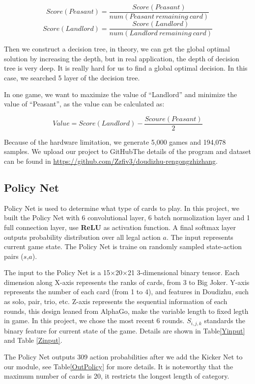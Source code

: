 \documentclass{article}
\begin{document}
$$
Score(Peasant) = \frac{Score (Peasant)}{num(Peasant \ remaining \ card)} $$
$$
Score(Landlord) = \frac{Score(Landlord)}{num(Landlord\  remaining \ card)}
$$

Then we construct a decision tree, in theory, we can get the global optimal solution by increasing the depth, but in real application, the depth of decision tree is very deep. It is really hard for us to find a global optimal decision. In this case, we searched 5 layer of the decision tree. 

In one game, we want to maximize the value of ``Landlord'' and minimize the value of ``Peasant'', as the value can be calculated as:

$$
Value = Score(Landlord)- \frac{Scoure(Peasant)}{2}
$$


Because of the hardware limitation, we generate 5,000 games and 194,078 samples. We upload our project to GitHubThe details of the program and dataset can be found in \url{https://github.com/Zzfiv3/doudizhu-rengongzhizhang}.

\subsection{Policy Net}
Policy Net is used to determine what type of cards to play. In this project, we built the Policy Net with 6 convolutional layer, 6 batch normolization layer and 1 full connection layer, use \textbf{ReLU} as activation function. A final softmax layer outputs probability distribution over all legal action $a$. The input represents current game state. The Policy Net is traine on randomly sampled state-action pairs ($s$,$a$). 

The input to the Policy Net is a 15$\times$20$\times$21 3-dimensional binary tensor. Each dimension along X-axis represents the ranks of cards, from 3 to Big Joker. Y-axis represents the number of each card (from 1 to 4), and features in Doudizhu, such as solo, pair, trio, etc. Z-axis represents the sequential information of each rounds, this design leaned from AlphaGo, make the variable length to fixed legth in game. In this project, we chose the most recent 6 rounds. $S_{i,j,k}$ standards the binary feature for current state of the game. Details are shown in Table\ref{Yinput} and Table \ref{Zinput}.

The Policy Net outputs 309 action probabilities after we add the Kicker Net to our module, see Table\ref{OutPolicy} for more details. It is noteworthy that the maximum number of cards is 20, it restricts the longest length of category.
\end{document}

